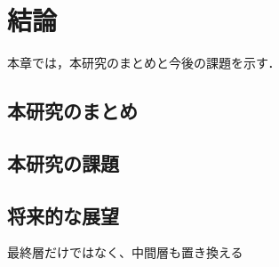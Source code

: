 \chapter{結論}
\label{conclusion}

本章では，本研究のまとめと今後の課題を示す．

\section{本研究のまとめ}

\section{本研究の課題}
\section{将来的な展望}
最終層だけではなく、中間層も置き換える

